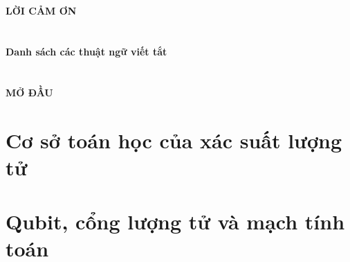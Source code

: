 \documentclass[12pt, a4paper, oneside]{report}
\theoremstyle{mycustomstyle}
\begin{document}


\pagestyle{fancy} %
\fancyhead[L]{\itshape \nouppercase{\rightmark}}
\fancyhead[R]{}

\newpage %
\mbox{}
\newpage

\chapter*{}
\begin{center}
    {\fontsize{20}{24}\selectfont\bfseries LỜI CẢM ƠN}
\end{center}
\vspace{1cm}


\tableofcontents %

\renewcommand{\listfigurename}{Danh sách hình vẽ}
\listoffigures

\newpage
\renewcommand{\listtablename}{Danh sách bảng}
\listoftables

\newpage
\chapter*{}
\begin{center}
    {\fontsize{20}{24}\selectfont\bfseries Danh sách các thuật ngữ viết tắt}
\end{center}


\chapter*{}
\begin{center}
    {\fontsize{20}{24}\selectfont\bfseries MỞ ĐẦU}
\end{center}
\markboth{}{}
\vspace{1cm} 


\pagestyle{fancy} 
\fancyhead[L]{\itshape \nouppercase{\rightmark}}

\chapter{Cơ sở toán học của xác suất lượng tử}


\chapter{Qubit, cổng lượng tử và mạch tính toán}

\end{document}
